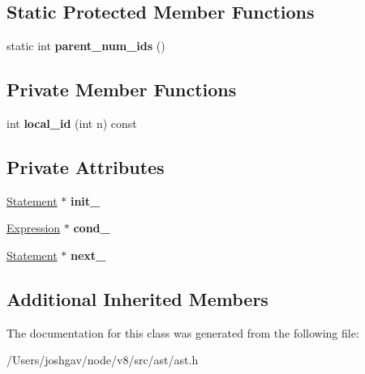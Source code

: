 \subsection*{Static Protected Member Functions}
\begin{DoxyCompactItemize}
\item 
static int {\bfseries parent\+\_\+num\+\_\+ids} ()\hypertarget{classv8_1_1internal_1_1_for_statement_a8a2f655a3270e1144bcda46c124b3591}{}\label{classv8_1_1internal_1_1_for_statement_a8a2f655a3270e1144bcda46c124b3591}

\end{DoxyCompactItemize}
\subsection*{Private Member Functions}
\begin{DoxyCompactItemize}
\item 
int {\bfseries local\+\_\+id} (int n) const \hypertarget{classv8_1_1internal_1_1_for_statement_a9473ca4df637888a8c46009635d8299e}{}\label{classv8_1_1internal_1_1_for_statement_a9473ca4df637888a8c46009635d8299e}

\end{DoxyCompactItemize}
\subsection*{Private Attributes}
\begin{DoxyCompactItemize}
\item 
\hyperlink{classv8_1_1internal_1_1_statement}{Statement} $\ast$ {\bfseries init\+\_\+}\hypertarget{classv8_1_1internal_1_1_for_statement_a9044adcad8af307ee53a52a20dc4176a}{}\label{classv8_1_1internal_1_1_for_statement_a9044adcad8af307ee53a52a20dc4176a}

\item 
\hyperlink{classv8_1_1internal_1_1_expression}{Expression} $\ast$ {\bfseries cond\+\_\+}\hypertarget{classv8_1_1internal_1_1_for_statement_a1304062e7b1e2f2bb6049b726c19cb27}{}\label{classv8_1_1internal_1_1_for_statement_a1304062e7b1e2f2bb6049b726c19cb27}

\item 
\hyperlink{classv8_1_1internal_1_1_statement}{Statement} $\ast$ {\bfseries next\+\_\+}\hypertarget{classv8_1_1internal_1_1_for_statement_a3080dba5a3eb2dd4018bb0fd1c2ad146}{}\label{classv8_1_1internal_1_1_for_statement_a3080dba5a3eb2dd4018bb0fd1c2ad146}

\end{DoxyCompactItemize}
\subsection*{Additional Inherited Members}


The documentation for this class was generated from the following file\+:\begin{DoxyCompactItemize}
\item 
/\+Users/joshgav/node/v8/src/ast/ast.\+h\end{DoxyCompactItemize}
